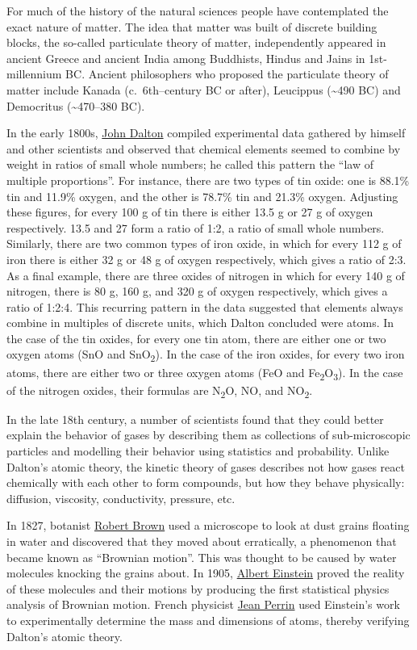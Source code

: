 For much of the history of the natural sciences people have contemplated the exact nature of matter. The idea that matter was built of discrete building blocks, the so-called particulate theory of matter, independently appeared in ancient Greece and ancient India among Buddhists, Hindus and Jains in 1st-millennium BC. Ancient philosophers who proposed the particulate theory of matter include Kanada (c.~6th--century BC or after), Leucippus (\textasciitilde490 BC) and Democritus (\textasciitilde470--380 BC).

In the early 1800s, \href{https://en.wikipedia.org/wiki/John_Dalton}{John Dalton} compiled experimental data gathered by himself and other scientists and observed that chemical elements seemed to combine by weight in ratios of small whole numbers; he called this pattern the ``law of multiple proportions''. For instance, there are two types of tin oxide: one is 88.1\% tin and 11.9\% oxygen, and the other is 78.7\% tin and 21.3\% oxygen. Adjusting these figures, for every 100 g of tin there is either 13.5 g or 27 g of oxygen respectively. 13.5 and 27 form a ratio of 1:2, a ratio of small whole numbers. Similarly, there are two common types of iron oxide, in which for every 112 g of iron there is either 32 g or 48 g of oxygen respectively, which gives a ratio of 2:3. As a final example, there are three oxides of nitrogen in which for every 140 g of nitrogen, there is 80 g, 160 g, and 320 g of oxygen respectively, which gives a ratio of 1:2:4. This recurring pattern in the data suggested that elements always combine in multiples of discrete units, which Dalton concluded were atoms. In the case of the tin oxides, for every one tin atom, there are either one or two oxygen atoms (SnO and SnO\textsubscript{2}). In the case of the iron oxides, for every two iron atoms, there are either two or three oxygen atoms (FeO and Fe\textsubscript{2}O\textsubscript{3}). In the case of the nitrogen oxides, their formulas are N\textsubscript{2}O, NO, and NO\textsubscript{2}.

In the late 18th century, a number of scientists found that they could better explain the behavior of gases by describing them as collections of sub-microscopic particles and modelling their behavior using statistics and probability. Unlike Dalton's atomic theory, the kinetic theory of gases describes not how gases react chemically with each other to form compounds, but how they behave physically: diffusion, viscosity, conductivity, pressure, etc.

In 1827, botanist \href{https://en.wikipedia.org/wiki/Robert_Brown_(botanist,_born_1773)}{Robert Brown} used a microscope to look at dust grains floating in water and discovered that they moved about erratically, a phenomenon that became known as ``Brownian motion''. This was thought to be caused by water molecules knocking the grains about. In 1905, \href{https://en.wikipedia.org/wiki/Albert_Einstein}{Albert Einstein} proved the reality of these molecules and their motions by producing the first statistical physics analysis of Brownian motion. French physicist \href{https://en.wikipedia.org/wiki/Jean_Baptiste_Perrin}{Jean Perrin} used Einstein's work to experimentally determine the mass and dimensions of atoms, thereby verifying Dalton's atomic theory.

